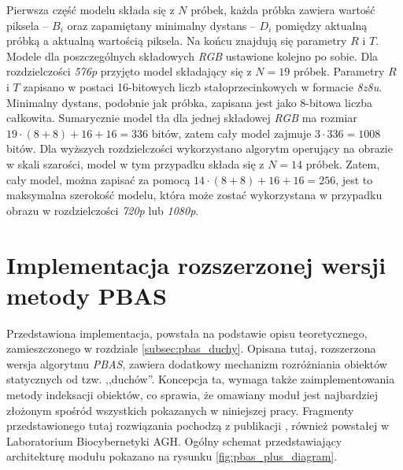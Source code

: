 Pierwsza część modelu składa się z $N$ próbek, każda próbka zawiera wartość piksela -- $B_i$ oraz zapamiętany minimalny dystans -- $D_i$ pomiędzy aktualną próbką a aktualną wartością piksela. Na końcu znajdują się parametry $R$ i $T$. Modele dla poszczególnych składowych \textit{RGB} ustawione kolejno po sobie. Dla rozdzielczości \textit{576p} przyjęto model składający się z $N=19$ próbek. Parametry $R$ i $T$ zapisano w postaci 16-bitowych liczb stałoprzecinkowych w formacie \textit{8z8u}. Minimalny dystans, podobnie jak próbka, zapisana jest jako 8-bitowa liczba całkowita. Sumarycznie model tła dla jednej składowej \textit{RGB} ma rozmiar $19 \cdot (8+8) + 16 + 16 = 336$ bitów, zatem cały model zajmuje $3 \cdot 336 = 1008$ bitów. Dla wyższych rozdzielczości wykorzystano algorytm operujący na obrazie w skali szarości, model w tym przypadku składa się z $N=14$ próbek. Zatem, cały model, można zapisać za pomocą $14 \cdot (8+8) + 16 + 16 = 256$, jest to maksymalna szerokość modelu, która może zostać wykorzystana w przypadku obrazu w rozdzielczości \textit{720p} lub \textit{1080p}. 


\section{Implementacja rozszerzonej wersji metody PBAS}
\label{sec:fpga_pbas_plus}

Przedstawiona implementacja, powstała na podstawie opisu teoretycznego, zamieszczonego w rozdziale \ref{subsec:pbas_duchy}. Opisana tutaj, rozszerzona wersja algorytmu \textit{PBAS}, zawiera dodatkowy mechanizm rozróżniania obiektów statycznych od tzw. ,,duchów''. Koncepcja ta, wymaga także zaimplementowania metody indeksacji obiektów, co sprawia, że omawiany moduł jest najbardziej złożonym spośród wszystkich pokazanych w niniejszej pracy. Fragmenty przedstawionego tutaj rozwiązania pochodzą z publikacji \cite{kryjak_14_pbas}, również powstałej w Laboratorium Biocybernetyki AGH. Ogólny schemat przedstawiający architekturę modułu pokazano na rysunku \ref{fig:pbas_plus_diagram}. 
	
